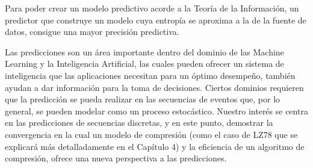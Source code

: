  













Para poder crear un modelo predictivo acorde a la Teoría de la Información, un predictor que construye un modelo cuya entropía se aproxima a la de la fuente de datos, consigue una mayor precisión predictiva. 


Las predicciones son un área importante dentro del dominio de las Machine Learning y la Inteligencia Artificial, las cuales pueden ofrecer un sistema de inteligencia que las aplicaciones necesitan para un óptimo desempeño, también ayudan a dar información para la toma de decisiones. Ciertos dominios requieren que la predicción se pueda realizar en las secuencias de eventos que, por lo general, se pueden modelar como un proceso estocástico. 
Nuestro interés se centra en las predicciones de secuencias discretas, y en este punto, demostrar la convergencia en la  cual un modelo de compresión (como el caso de LZ78 que se explicará más detalladamente en el Capítulo 4) y la eficiencia de un algoritmo de compresión, ofrece una nueva perspectiva a las predicciones. 


